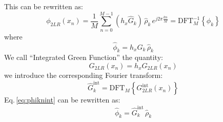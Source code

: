 This can be rewritten as:
\begin{equation}
\phi_{2LR}(x_n) = 
\frac{1}{M}
\sum_{n=0}^{M-1}  
(h_x\hat{G}_k) \, \hat{\rho}_k\, e^{j2\pi \frac{kn}{M}} 
=\text{DFT}_M^{-1}\left\{\phi_k
\right\}
\label{eq:invfft}
\end{equation}
where 
\begin{equation}
\hat{\phi}_k =h_x\hat{G}_k \, \hat{\rho}_k
\label{eq:phiknint}
\end{equation}
We call ``Integrated Green Function'' the quantity:
\begin{equation}
G_{2LR}(x_n) = h_x G_{2LR}(x_n)
\end{equation}
we introduce the corresponding Fourier transform:
\begin{equation}
\hat{G}_k^\text{int} = \text{DFT}_M\left\{ G_{2LR}^\text{int}(x_n)\right\}
\end{equation}
Eq.\,\eqref{eq:phiknint} can be rewritten as:
\begin{equation}
\boxed{
\hat{\phi}_k =\hat{G}_k^\text{int} \, \hat{\rho}_k}
\end{equation}

